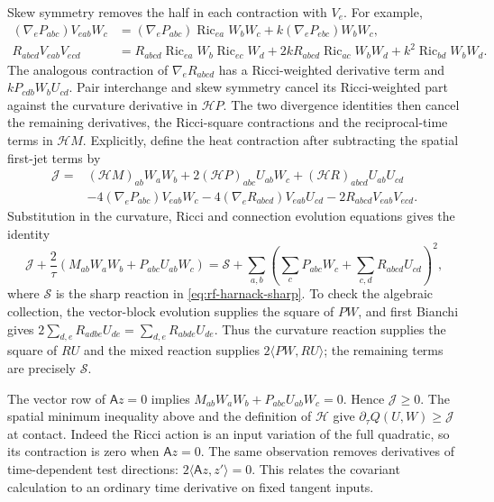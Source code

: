 Skew symmetry removes the half in each contraction with $V_e$.
For example,
\[
\begin{split}
 (\nabla_eP_{abc})V_{eab}W_c
 &= (\nabla_eP_{abc})\operatorname{Ric}_{ea}W_bW_c
      +k(\nabla_eP_{ebc})W_bW_c,\\
 R_{abcd}V_{eab}V_{ecd}
 &=R_{abcd}\operatorname{Ric}_{ea}W_b\operatorname{Ric}_{ec}W_d
   +2kR_{abcd}\operatorname{Ric}_{ac}W_bW_d
   +k^2\operatorname{Ric}_{bd}W_bW_d.
\end{split}
\]
The analogous contraction of $\nabla_eR_{abcd}$ has a
Ricci-weighted derivative term and $kP_{cdb}W_bU_{cd}$.
Pair interchange and skew symmetry cancel its Ricci-weighted part
against the curvature derivative in $\mathcal HP$.
The two divergence identities then cancel the remaining derivatives,
the Ricci-square contractions and the reciprocal-time terms in
$\mathcal HM$.  Explicitly, define the heat contraction after
subtracting the spatial first-jet terms by
\[
\begin{split}
 \mathcal J={}&(\mathcal HM)_{ab}W_aW_b
       +2(\mathcal HP)_{abc}U_{ab}W_c
       +(\mathcal HR)_{abcd}U_{ab}U_{cd}\\
 &-4(\nabla_eP_{abc})V_{eab}W_c
  -4(\nabla_eR_{abcd})V_{eab}U_{cd}
  -2R_{abcd}V_{eab}V_{ecd}.
\end{split}
\]
Substitution in the curvature, Ricci and connection evolution equations
gives the identity
\begin{equation}\label{eq:rf-harnack-jet-reaction}
 \mathcal J+\frac2\tau(M_{ab}W_aW_b+P_{abc}U_{ab}W_c)
 =\mathcal S+\sum_{a,b}
       \left(\sum_cP_{abc}W_c+\sum_{c,d}R_{abcd}U_{cd}\right)^2,
\end{equation}
where $\mathcal S$ is the sharp reaction in
\eqref{eq:rf-harnack-sharp}.  To check the algebraic collection,
the vector-block evolution supplies the square of $PW$, and first
Bianchi gives
$2\sum_{d,e}R_{adbe}U_{de}=\sum_{d,e}R_{abde}U_{de}$.
Thus the curvature reaction supplies the square of $RU$ and the
mixed reaction supplies $2\langle PW,RU\rangle$; the remaining
terms are precisely $\mathcal S$.

The vector row of $\mathsf A z=0$ implies
$M_{ab}W_aW_b+P_{abc}U_{ab}W_c=0$.  Hence $\mathcal J\geq0$.
The spatial minimum inequality above and the definition of $\mathcal H$
give $\partial_\tau Q(U,W)\geq\mathcal J$ at contact.
Indeed the Ricci action is an input variation of the full quadratic,
so its contraction is zero when $\mathsf A z=0$.
The same observation removes derivatives of time-dependent test
directions: $2\langle\mathsf A z,z'\rangle=0$.
This relates the covariant calculation to an ordinary time derivative
on fixed tangent inputs.

